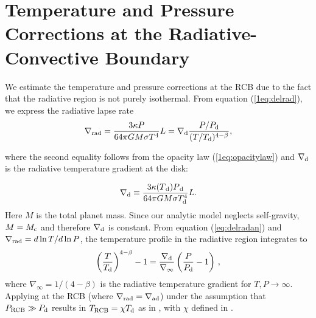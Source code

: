 \section{Temperature and Pressure Corrections at the Radiative-Convective Boundary}
\label{RCBcorr}

We estimate the temperature and pressure corrections at the RCB due to the fact that the radiative region is not purely isothermal. From equation (\ref{1eq:delrad}), we express the radiative lapse rate
\begin{equation}\label{eq:delradan}
\nabla_{\rm rad} = {3 \kappa P \over 64 \pi  G M \sigma T^4} L = \nabla_{\rm d} {P/P_{\rm d} \over (T/T_{\rm d})^{4-\beta}},
\end{equation}

\noindent where the second equality follows from the opacity law (\ref{1eq:opacitylaw}) and $\nabla_{\rm d}$ is the radiative temperature gradient at the disk:

\begin{equation}
\label{eq:delo}
\nabla _{\rm d} \equiv \frac{3 \kappa(T{_{\rm d}}) P{_{\rm d}}}{64 \pi G M \sigma T_{\rm d}^4} L.
\end{equation}
Here $M$ is the total planet mass. Since our analytic model neglects self-gravity, $M=M_{\rm c}$ and therefore $\nabla_{\rm d}$ is constant. From equation (\ref{eq:delradan}) and $\nabla_{\rm rad}=d \ln T / d\ln P$, the temperature profile in the radiative region integrates to
\begin{equation}\label{eq:radTP}
\left(T \over T_{\rm d}\right)^{4-\beta} - 1 = {\nabla_{\rm d} \over \nabla_\infty} \left( {P \over P_{\rm d}} - 1 \right) \, ,
\end{equation} 
where $\nabla_\infty = 1/(4-\beta)$ is the radiative temperature gradient for $T ,P \rightarrow \infty$.
Applying  at the RCB (where $\nabla_{\rm rad} = \nabla_{\rm ad}$) under the assumption that $P_{\rm RCB} \gg P_{\rm d}$ results in  $T_{\rm RCB}=\chi T_{\rm d}$ as in , with $\chi$ defined in .


